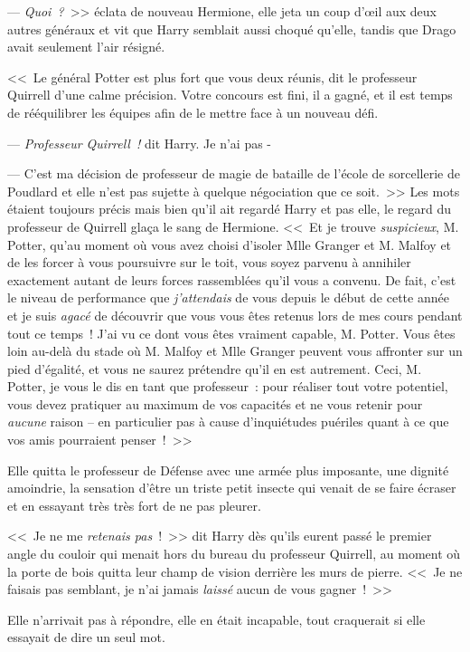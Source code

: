 --- \emph{Quoi~?}~>> éclata de nouveau Hermione, elle jeta un coup d'œil aux deux autres généraux et vit que Harry semblait aussi choqué qu'elle, tandis que Drago avait seulement l'air résigné.

<<~Le général Potter est plus fort que vous deux réunis, dit le professeur Quirrell d'une calme précision. Votre concours est fini, il a gagné, et il est temps de rééquilibrer les équipes afin de le mettre face à un nouveau défi.

--- \emph{Professeur Quirrell~!} dit Harry. Je n'ai pas -

--- C'est ma décision de professeur de magie de bataille de l'école de sorcellerie de Poudlard et elle n'est pas sujette à quelque négociation que ce soit.~>> Les mots étaient toujours précis mais bien qu'il ait regardé Harry et pas elle, le regard du professeur de Quirrell glaça le sang de Hermione. <<~Et je trouve \emph{suspicieux}, M. Potter, qu'au moment où vous avez choisi d'isoler Mlle Granger et M. Malfoy et de les forcer à vous poursuivre sur le toit, vous soyez parvenu à annihiler exactement autant de leurs forces rassemblées qu'il vous a convenu. De fait, c'est le niveau de performance que \emph{j'attendais} de vous depuis le début de cette année et je suis \emph{agacé} de découvrir que vous vous êtes retenus lors de mes cours pendant tout ce temps~! J'ai vu ce dont vous êtes vraiment capable, M. Potter. Vous êtes loin au-delà du stade où M. Malfoy et Mlle Granger peuvent vous affronter sur un pied d'égalité, et vous ne saurez prétendre qu'il en est autrement. Ceci, M. Potter, je vous le dis en tant que professeur~: pour réaliser tout votre potentiel, vous devez pratiquer au maximum de vos capacités et ne vous retenir pour \emph{aucune} raison -- en particulier pas à cause d'inquiétudes puériles quant à ce que vos amis pourraient penser~!~>>

\later

Elle quitta le professeur de Défense avec une armée plus imposante, une dignité amoindrie, la sensation d'être un triste petit insecte qui venait de se faire écraser et en essayant très très fort de ne pas pleurer.

<<~Je ne me \emph{retenais pas}~!~>> dit Harry dès qu'ils eurent passé le premier angle du couloir qui menait hors du bureau du professeur Quirrell, au moment où la porte de bois quitta leur champ de vision derrière les murs de pierre. <<~Je ne faisais pas semblant, je n'ai jamais \emph{laissé} aucun de vous gagner~!~>>

Elle n'arrivait pas à répondre, elle en était incapable, tout craquerait si elle essayait de dire un seul mot.

